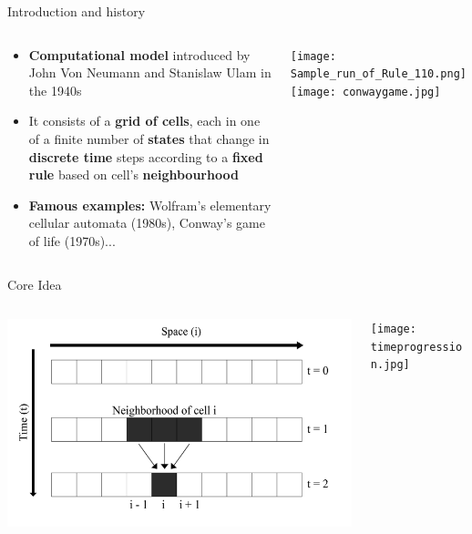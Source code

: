 \begin{frame}{Introduction and history }
 \begin{columns}
     \begin{column}{0.6\textwidth}
          \begin{block}{}
	
    \begin{itemize}
    \item 
    \textbf{Computational model} introduced by John Von Neumann and Stanislaw Ulam in the 1940s
    \item 
    It consists of a \textbf{grid of cells}, each in one of a finite number of \textbf{states} that change in \textbf{discrete time} steps according to a \textbf{fixed rule} based on cell's \textbf{neighbourhood}
        \item \textbf{Famous examples:}  Wolfram's elementary cellular automata (1980s), Conway's game of life (1970s)...
    \end{itemize}
  \end{block}
     \end{column}
        \centering
        \texttt{[image: Sample\_run\_of\_Rule\_110.png]}
        \texttt{[image: conwaygame.jpg]}
 \end{columns}
\end{frame}


\begin{frame}{Core Idea}

\begin{columns}
    \begin{column}{0.8\textwidth}
                \includegraphics[width = 1.0\textwidth]{slike/intro.png}

    \end{column}
    \begin{column}{0.5\textwidth}
                    \texttt{[image: timeprogression.jpg]}

    \end{column}
\end{columns}

\end{frame}

